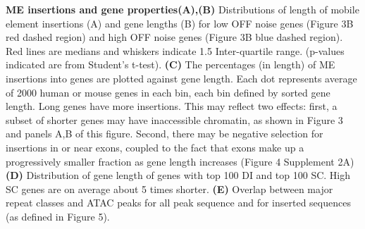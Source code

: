 \textbf{ME insertions and gene properties}\textbf{(A),(B)} Distributions of length of mobile element insertions (A) and gene lengths (B) for low OFF noise genes (Figure 3B red dashed region) and high OFF noise genes (Figure 3B blue dashed region). Red lines are medians and whiskers indicate 1.5 Inter-quartile range. (p-values indicated are from Student’s t-test). \textbf{(C)} The percentages (in length) of ME insertions into genes are plotted against gene length. Each dot represents average of 2000 human or mouse genes in each bin, each bin defined by sorted gene length. Long genes have more insertions. This may reflect two effects: first, a subset of shorter genes may have inaccessible chromatin, as shown in Figure 3 and panels A,B of this figure. Second, there may be negative selection for insertions in or near exons, coupled to the fact that exons make up a progressively smaller fraction as gene length increases (Figure 4 Supplement 2A) \textbf{(D)} Distribution of gene length of genes with top 100 DI and top 100 SC. High SC genes are on average about 5 times shorter. \textbf{(E)} Overlap between major repeat classes and ATAC peaks for all peak sequence and for inserted sequences (as defined in Figure 5).